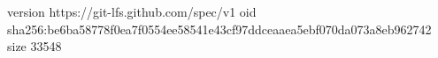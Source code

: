 version https://git-lfs.github.com/spec/v1
oid sha256:be6ba58778f0ea7f0554ee58541e43cf97ddceaaea5ebf070da073a8eb962742
size 33548
